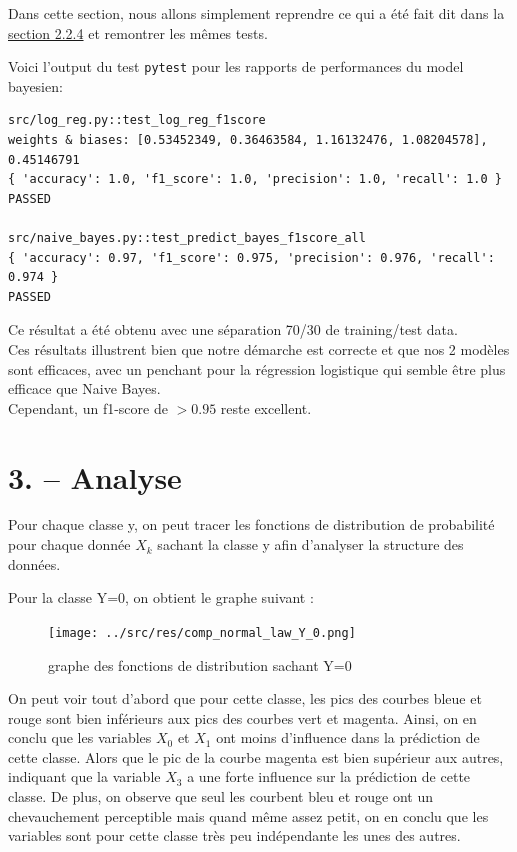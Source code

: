 \documentclass[
]{article}
\begin{document}
Dans cette section, nous allons simplement reprendre ce qui a été fait
dit dans la \href{#ruxe9sultats}{section 2.2.4} et remontrer les mêmes
tests.

Voici l'output du test \texttt{pytest} pour les rapports de performances
du model bayesien:

\begin{lstlisting}
src/log_reg.py::test_log_reg_f1score 
weights & biases: [0.53452349, 0.36463584, 1.16132476, 1.08204578], 0.45146791  
{ 'accuracy': 1.0, 'f1_score': 1.0, 'precision': 1.0, 'recall': 1.0 }
PASSED

src/naive_bayes.py::test_predict_bayes_f1score_all  
{ 'accuracy': 0.97, 'f1_score': 0.975, 'precision': 0.976, 'recall': 0.974 }
PASSED
\end{lstlisting}

Ce résultat a été obtenu avec une séparation 70/30 de training/test
data.\\
Ces résultats illustrent bien que notre démarche est correcte et que nos
2 modèles sont efficaces, avec un penchant pour la régression logistique
qui semble être plus efficace que Naive Bayes.\\
Cependant, un f1-score de \(> 0.95\) reste excellent.

\newpage{}

\hypertarget{analyse}{%
\section{3. -- Analyse}\label{analyse}}

Pour chaque classe y, on peut tracer les fonctions de distribution de
probabilité pour chaque donnée \(X_k\) sachant la classe y afin
d'analyser la structure des données.

Pour la classe Y=0, on obtient le graphe suivant :

\begin{figure}
\centering
\texttt{[image: ../src/res/comp\_normal\_law\_Y\_0.png]}
\caption{graphe des fonctions de distribution sachant Y=0}
\end{figure}

On peut voir tout d'abord que pour cette classe, les pics des courbes
bleue et rouge sont bien inférieurs aux pics des courbes vert et
magenta. Ainsi, on en conclu que les variables \(X_0\) et \(X_1\) ont
moins d'influence dans la prédiction de cette classe. Alors que le pic
de la courbe magenta est bien supérieur aux autres, indiquant que la
variable \(X_3\) a une forte influence sur la prédiction de cette
classe. De plus, on observe que seul les courbent bleu et rouge ont un
chevauchement perceptible mais quand même assez petit, on en conclu que
les variables sont pour cette classe très peu indépendante les unes des
autres.
\end{document}
